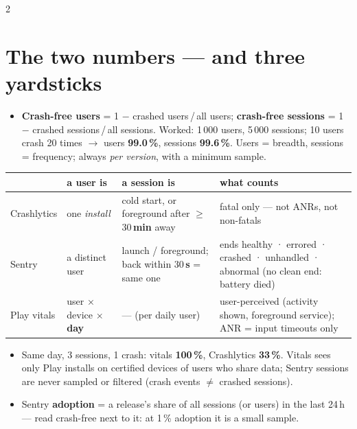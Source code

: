 \documentclass[8pt]{extarticle}
\begin{document}
\begin{multicols}{2}
\small{}\raggedright

\section{The two numbers — and three yardsticks}
\begin{itemize}
  \item \textbf{Crash-free users} = 1 $-$ crashed users\,/\,all users;
        \textbf{crash-free sessions} = 1 $-$ crashed sessions\,/\,all sessions.
        Worked: 1\,000 users, 5\,000 sessions; 10 users crash 20 times $\to$
        users \textbf{99.0\,\%}, sessions \textbf{99.6\,\%}. Users = breadth, sessions
        = frequency; always \emph{per version}, with a minimum sample.
\end{itemize}
{\footnotesize\setlength{\tabcolsep}{3pt}
\begin{tabular}{@{}>{\raggedright\arraybackslash}p{12mm}>{\raggedright\arraybackslash}p{13mm}>{\raggedright\arraybackslash}p{25mm}>{\raggedright\arraybackslash}p{24mm}@{}}
\toprule
& \textbf{a user is} & \textbf{a session is} & \textbf{what counts}\\ \midrule
Crashlytics & one \emph{install} & cold start, or foreground after $\ge$\,30\,\textbf{min} away & fatal only — not ANRs, not non-fatals\\
Sentry & a distinct user & launch / foreground; back within 30\,\textbf{s} = same one & ends healthy · errored · crashed · unhandled · abnormal (no clean end: battery died)\\
Play vitals & user × device × \textbf{day} & — (per daily user) & user-perceived (activity shown, foreground service); ANR = input timeouts only\\
\bottomrule
\end{tabular}}
\begin{itemize}
  \item Same day, 3 sessions, 1 crash: vitals \textbf{100\,\%}, Crashlytics \textbf{33\,\%}.
        Vitals sees only Play installs on certified devices of users who share data;
        Sentry sessions are never sampled or filtered (crash events $\neq$ crashed sessions).
  \item Sentry \textbf{adoption} = a release's share of all sessions (or users) in the last
        24\,h — read crash-free next to it: at 1\,\% adoption it is a small sample.
\end{itemize}


\end{multicols}
\end{document}
